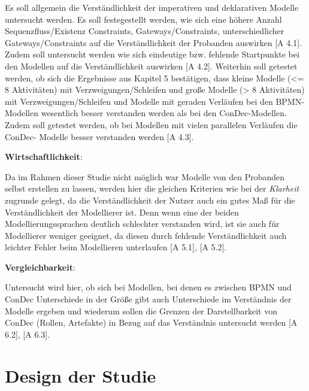 Es soll allgemein die Verständlichkeit der imperativen und deklarativen Modelle untersucht werden. Es soll festegestellt werden, wie sich eine höhere Anzahl Sequenzfluss/Existenz Constraints, Gateways/Constraints,  unterschiedlicher Gateways/Constraints auf die Verständlichkeit der Probanden auswirken [A 4.1].\newline
Zudem soll untersucht werden wie sich eindeutige bzw. fehlende Startpunkte bei den Modellen auf die Verständlichkeit auswirken [A 4.2].
Weiterhin soll getestet werden, ob sich die Ergebnisse aus Kapitel 5 bestätigen, dass kleine Modelle (<= 8 Aktivitäten) mit Verzweigungen/Schleifen und große Modelle (> 8 Aktivitäten) mit Verzweigungen/Schleifen und Modelle mit geraden Verläufen bei den BPMN-Modellen wesentlich besser verstanden werden als bei den ConDec-Modellen.\newline
Zudem soll getestet werden, ob bei Modellen mit vielen parallelen Verläufen die ConDec- Modelle besser verstanden werden [A 4.3].\newline

\textbf{Wirtschaftlichkeit}: 

Da im Rahmen dieser Studie nicht möglich war Modelle von den Probanden selbst erstellen zu lassen, werden hier die gleichen Kriterien wie bei der \textit{Klarheit} zugrunde gelegt, da die Verständlichkeit der Nutzer auch ein gutes Maß für die Verständlichkeit der Modellierer ist. Denn wenn eine der beiden Modellierungssprachen deutlich schlechter verstanden wird, ist sie auch für Modellierer weniger geeignet, da diesen durch fehlende Verständlichkeit auch leichter Fehler beim Modellieren unterlaufen [A 5.1], [A 5.2].\newline

\textbf{Vergleichbarkeit}: 

Untersucht wird hier, ob sich bei Modellen, bei denen es zwischen BPMN und ConDec Unterschiede in der Größe gibt auch Unterschiede im Verständnis der Modelle ergeben und wiederum sollen die Grenzen der Darstellbarkeit von ConDec (Rollen, Artefakte) in Bezug auf das Verständnis untersucht werden [A 6.2], [A 6.3].\newline

\section{Design der Studie}

